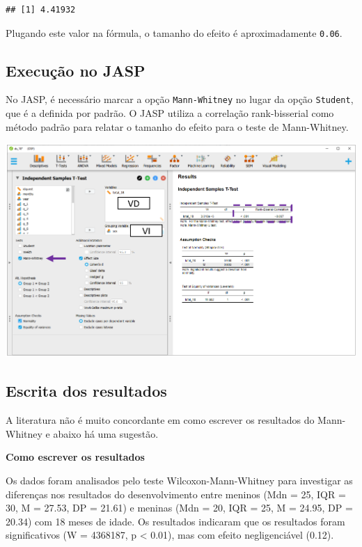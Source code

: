 \documentclass[
]{book}
\begin{document}
\begin{verbatim}
## [1] 4.41932
\end{verbatim}

Plugando este valor na fórmula, o tamanho do efeito é aproximadamente \texttt{0.06}.

\hypertarget{execuuxe7uxe3o-no-jasp-5}{%
\subsection{Execução no JASP}\label{execuuxe7uxe3o-no-jasp-5}}

No JASP, é necessário marcar a opção \texttt{Mann-Whitney} no lugar da opção \texttt{Student}, que é a definida por padrão. O JASP utiliza a correlação rank-bisserial como método padrão para relatar o tamanho do efeito para o teste de Mann-Whitney.

\includegraphics{./img/cap_testet_mw.png}

\hypertarget{escrita-dos-resultados-3}{%
\subsection{Escrita dos resultados}\label{escrita-dos-resultados-3}}

A literatura não é muito concordante em como escrever os resultados do Mann-Whitney e abaixo há uma sugestão.

\textbf{Como escrever os resultados}

Os dados foram analisados pelo teste Wilcoxon-Mann-Whitney para investigar as diferenças nos resultados do desenvolvimento entre meninos (Mdn = 25, IQR = 30, M = 27.53, DP = 21.61) e meninas (Mdn = 20, IQR = 25, M = 24.95, DP = 20.34) com 18 meses de idade. Os resultados indicaram que os resultados foram significativos (W = 4368187, p \textless{} 0.01), mas com efeito negligenciável (0.12).
\end{document}
